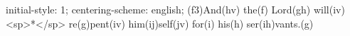 initial-style: 1;
centering-scheme: english;
(f3)And(hv) the(f) Lord(gh) will(iv) <sp>*</sp> re(g)pent(iv) him(ij)self(jv) for(i) his(h) ser(ih)vants.(g)
